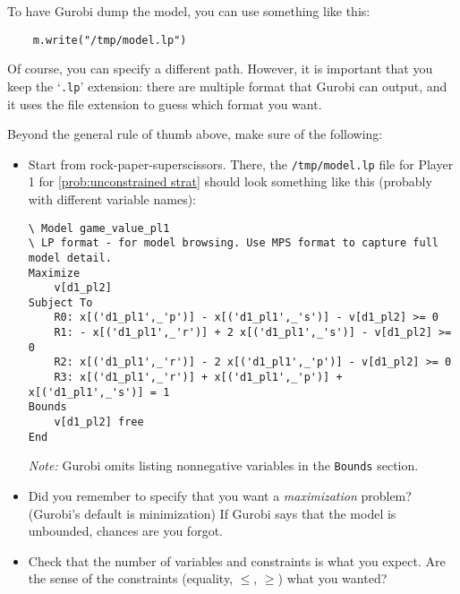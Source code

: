 \documentclass{homework}
\begin{document}
To have Gurobi dump the model, you can use something like this:
\begin{verbatim}
    m.write("/tmp/model.lp")
\end{verbatim}
Of course, you can specify a different path. However, it is important that you keep the `\texttt{.lp}' extension: there are multiple format that Gurobi can output, and it uses the file extension to guess which format you want.

Beyond the general rule of thumb above, make sure of the following:
\begin{itemize}
    \item Start from rock-paper-superscissors. There, the \verb|/tmp/model.lp| file for Player 1 for \cref{prob:unconstrained strat} should look something like this (probably with different variable names):
\begin{verbatim}
\ Model game_value_pl1
\ LP format - for model browsing. Use MPS format to capture full model detail.
Maximize
    v[d1_pl2]
Subject To
    R0: x[('d1_pl1',_'p')] - x[('d1_pl1',_'s')] - v[d1_pl2] >= 0
    R1: - x[('d1_pl1',_'r')] + 2 x[('d1_pl1',_'s')] - v[d1_pl2] >= 0
    R2: x[('d1_pl1',_'r')] - 2 x[('d1_pl1',_'p')] - v[d1_pl2] >= 0
    R3: x[('d1_pl1',_'r')] + x[('d1_pl1',_'p')] + x[('d1_pl1',_'s')] = 1
Bounds
    v[d1_pl2] free
End    
\end{verbatim}
    \emph{Note:} Gurobi omits listing nonnegative variables in the \verb|Bounds| section.
    \item Did you remember to specify that you want a \emph{maximization} problem? (Gurobi's default is minimization) If Gurobi says that the model is unbounded, chances are you forgot.
    \item Check that the number of variables and constraints is what you expect. Are the sense of the constraints (equality, $\le$, $\ge$) what you wanted?
\end{itemize}



\end{document}
